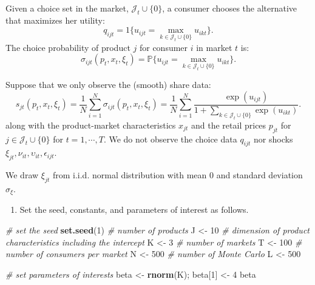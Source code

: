 \documentclass[
]{book}
\newenvironment{Shaded}{\begin{snugshade}}{\end{snugshade}}
\newcommand{\CommentTok}[1]{\textcolor[rgb]{0.56,0.35,0.01}{\textit{#1}}}
\newcommand{\DecValTok}[1]{\textcolor[rgb]{0.00,0.00,0.81}{#1}}
\newcommand{\KeywordTok}[1]{\textcolor[rgb]{0.13,0.29,0.53}{\textbf{#1}}}
\newcommand{\NormalTok}[1]{#1}
\newcommand{\StringTok}[1]{\textcolor[rgb]{0.31,0.60,0.02}{#1}}
\providecommand{\tightlist}{%
  \setlength{\itemsep}{0pt}\setlength{\parskip}{0pt}}
\begin{document}
Given a choice set in the market, \(\mathcal{J}_t \cup \{0\}\), a consumer chooses the alternative that maximizes her utility:
\[
q_{ijt} = 1\{u_{ijt} = \max_{k \in \mathcal{J}_t \cup \{0\}} u_{ikt}\}.
\]
The choice probability of product \(j\) for consumer \(i\) in market \(t\) is:
\[
\sigma_{ijt}(p_t, x_t, \xi_t) = \mathbb{P}\{u_{ijt} = \max_{k \in \mathcal{J}_t \cup \{0\}} u_{ikt}\}.
\]

Suppose that we only observe the (smooth) share data:
\[
s_{jt}(p_t, x_t, \xi_t) = \frac{1}{N} \sum_{i = 1}^N \sigma_{ijt}(p_t, x_t, \xi_t) = \frac{1}{N} \sum_{i = 1}^N \frac{\exp(u_{ijt})}{1 + \sum_{k \in \mathcal{J}_t \cup \{0\}} \exp(u_{ikt})}. 
\]
along with the product-market characteristics \(x_{jt}\) and the retail prices \(p_{jt}\) for \(j \in \mathcal{J}_t \cup \{0\}\) for \(t = 1, \cdots, T\). We do not observe the choice data \(q_{ijt}\) nor shocks \(\xi_{jt}, \nu_{it}, \upsilon_{it}, \epsilon_{ijt}\).

We draw \(\xi_{jt}\) from i.i.d. normal distribution with mean 0 and standard deviation \(\sigma_{\xi}\).

\begin{enumerate}
\def\labelenumi{\arabic{enumi}.}
\tightlist
\item
  Set the seed, constants, and parameters of interest as follows.
\end{enumerate}

\begin{Shaded}
\begin{Highlighting}[]
\CommentTok{# set the seed}
\KeywordTok{set.seed}\NormalTok{(}\DecValTok{1}\NormalTok{)}
\CommentTok{# number of products}
\NormalTok{J <-}\StringTok{ }\DecValTok{10}
\CommentTok{# dimension of product characteristics including the intercept}
\NormalTok{K <-}\StringTok{ }\DecValTok{3}
\CommentTok{# number of markets}
\NormalTok{T <-}\StringTok{ }\DecValTok{100}
\CommentTok{# number of consumers per market}
\NormalTok{N <-}\StringTok{ }\DecValTok{500}
\CommentTok{# number of Monte Carlo}
\NormalTok{L <-}\StringTok{ }\DecValTok{500}
\end{Highlighting}
\end{Shaded}

\begin{Shaded}
\begin{Highlighting}[]
\CommentTok{# set parameters of interests}
\NormalTok{beta <-}\StringTok{ }\KeywordTok{rnorm}\NormalTok{(K); }
\NormalTok{beta[}\DecValTok{1}\NormalTok{] <-}\StringTok{ }\DecValTok{4}
\NormalTok{beta}
\end{Highlighting}
\end{Shaded}
\end{document}
